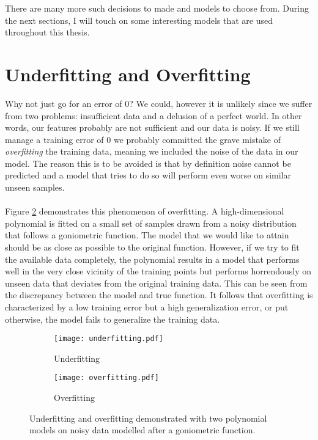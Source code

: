 There are many more such decisions to made
and models to choose from.
During the next sections,
I will touch on some interesting
models that are used throughout this thesis.

\section{Underfitting and Overfitting}
Why not just go for an error of $0$?
We could, however it is unlikely since we suffer from two problems:
insufficient data and a delusion of a perfect world.
In other words, our features probably are not sufficient
and our data is noisy.
If we still manage a training error of $0$
we probably committed the grave mistake of
\textit{overfitting} the training data,
meaning we included the noise of the data in our model.
The reason this is to be avoided is that by definition
noise cannot be predicted and a model that tries
to do so will perform even worse on similar unseen samples.

\paragraph{}
Figure
\ref{fig:overfitting}
demonstrates this phenomenon of overfitting.
A high-dimensional polynomial is fitted on
a small set of samples drawn from a noisy
distribution that follows a goniometric function.
The model that we would like to attain
should be as close as possible to the original function.
However, if we try to fit the available data completely,
the polynomial results in a model that performs
well in the very close vicinity of the training points
but performs horrendously on unseen data
that deviates from the original training data.
This can be seen from the discrepancy
between the model and true function.
It follows that overfitting is characterized by
a low training error but a high generalization error,
or put otherwise,
the model fails to generalize the training data.

\begin{figure}[h]
\center
\begin{subfigure}{.49\textwidth}
  \centering
  \texttt{[image: underfitting.pdf]}
  \caption{Underfitting}
  \label{fig:underfitting}
\end{subfigure}
\begin{subfigure}{.49\textwidth}
  \centering
  \texttt{[image: overfitting.pdf]}
  \caption{Overfitting}
  \label{fig:overfitting}
\end{subfigure}

\label{fig:fitting}
\caption{
Underfitting and overfitting
demonstrated with two polynomial
models on noisy data modelled
after a goniometric function.
}
\end{figure}

